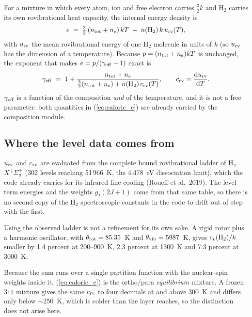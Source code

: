 \documentclass[english,a4paper]{my_memo}
\begin{document}
For a mixture in which every atom, ion and free electron carries
$\tfrac{3}{2} k$ and H$_2$ carries its own rovibrational heat capacity, the
internal energy density is
%
\begin{equation}
  e \;=\; \tfrac{3}{2}\,(n_{\rm tot} + n_e)\,k T \;+\; n({\rm H_2})\,k\,
          u_{\rm rv}(T) ,
  \label{eq:caloric_e}
\end{equation}
%
with $u_{\rm rv}$ the mean rovibrational energy of one H$_2$ molecule in units
of $k$ (so $u_{\rm rv}$ has the dimension of a temperature). Because
$p = (n_{\rm tot}+n_e) k T$ is unchanged, the exponent that makes
$e = p/(\gamma_{\rm eff}-1)$ exact is
%
\begin{equation}
  \gamma_{\rm eff} \;=\; 1 + \frac{n_{\rm tot} + n_e}
      {\tfrac{3}{2}(n_{\rm tot}+n_e) + n({\rm H_2})\,c_{\rm rv}(T)} ,
  \qquad c_{\rm rv} = \frac{{\rm d} u_{\rm rv}}{{\rm d} T} .
  \label{eq:gamma_eff}
\end{equation}
%
$\gamma_{\rm eff}$ is a function of the composition \emph{and} of the
temperature, and it is not a free parameter: both quantities in
(\ref{eq:caloric_e}) are already carried by the composition module.

\subsection{Where the level data comes from}

$u_{\rm rv}$ and $c_{\rm rv}$ are evaluated from the complete bound
rovibrational ladder of H$_2$ $X\,^1\Sigma_g^+$ (302 levels reaching
51\,966~K, the 4.478~eV dissociation limit), which the code already carries
for its infrared line cooling (Roueff et al.\ 2019). The level term energies and
the weights $g_I(2J+1)$ come from that same table, so there is no second copy
of the H$_2$ spectroscopic constants in the code to drift out of step with the
first.

Using the observed ladder is not a refinement for its own sake. A rigid rotor
plus a harmonic oscillator, with $\theta_{\rm rot} = 85.35$~K and
$\theta_{\rm vib} = 5987$~K, gives $c_v({\rm H_2})/k$ smaller by 1.4 percent
at 200--900~K, 2.3 percent at 1300~K and 7.3 percent at 3000~K.

Because the sum runs over a single partition function with the nuclear-spin
weights inside it, (\ref{eq:caloric_e}) is the ortho/para \emph{equilibrium}
mixture. A frozen $3\!:\!1$ mixture gives the same $c_{\rm rv}$ to four
decimals at and above 300~K and differs only below $\sim 250$~K, which is
colder than the layer reaches, so the distinction does not arise here.
\end{document}
